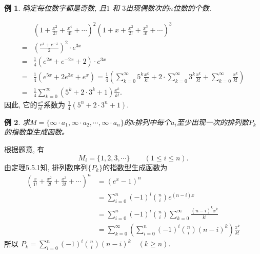 \documentclass[punct]{ctexbeamer}
\newtheorem{ex}{例}[section]
\def\sol{\noindent {\bf 解\ }}
\begin{document}
\begin{frame}
    \begin{ex}
        确定每位数字都是奇数, 且$1$ 和 $3$出现偶数次的$n$位数的个数.
    \end{ex}
    \pause\sol
    $$\begin{aligned}
        &\left(1+\frac{x^{2}}{2 !}+\frac{x^{4}}{4 !}+\cdots\right)^{2}\left(1+x+\frac{x^{2}}{2 !}+\frac{x^{3}}{3 !}+\cdots\right)^{3} \\ =&\left(\frac{e^{x}+e^{-x}}{2}\right)^{2} \cdot e^{3 x} \\
        =& \frac{1}{4}\left(e^{2 x}+e^{-2 x}+2\right) \cdot e^{3 x}\\
        =&\frac{1}{4}\left(e^{5 x}+2 e^{3 x}+e^{x}\right)=\frac{1}{4}\left(\sum_{k=0}^{\infty} 5^{k} \frac{ x^{k}}{k !}+2 \cdot \sum_{k=0}^{\infty} 3^{k} \frac{ x^{k}}{k !}+\sum_{k=0}^{\infty} \frac{x^{k}}{k !}\right)\\
        =&\frac{1}{4} \sum_{k=0}^{\infty}\left(5^{k}+2 \cdot 3^{k}+1\right) \frac{x^{k}}{k !}.
    \end{aligned}$$
    因此, 它的$\frac{x^{n}}{n!}$系数为
    $\frac{1}{4}\left(5^{n}+2 \cdot 3^{n}+1\right).$
\end{frame}



\begin{frame}
	\begin{ex}
		求$M=\{\infty\cdot a_{1},\infty\cdot a_{2},\cdots,\infty\cdot a_{n} \}$的$k$排列中每个$a_{i}$至少出现一次的排列数$P_{k}$的指数型生成函数。
	\end{ex}
\pause\sol
根据题意, 有$$M_{i}=\{1,2,3,\cdots\} \quad\quad (1\leq i\leq n).$$
由定理5.5.1知, 排列数序列$\{P_{k}\}$的指数型生成函数为
$$\begin{aligned}
\left(\frac{x}{1 !}+\frac{x^{2}}{2 !}+\frac{x^{3}}{3 !}+\cdots\right)^{n} &=\left(e^x-1\right)^{n} \\
&=\sum_{i=0}^{n}(-1)^{i}\binom{n}{i} e^{(n-i)x}  \\
&=\sum_{i=0}^{n}(-1)^{i}\binom{n}{i}\sum_{k=0}^{\infty} \frac{(n-i)^{k} x^{k}}{k !} \\
&=\sum_{k=0}^{\infty}\left( \sum_{i=0}^{n}(-1)^{i}\binom{n}{i}(n-i)^{k}\right) \frac{x^{k}}{k !}
\end{aligned}$$
所以
$	P_{k}=\sum_{i=0}^{n}(-1)^{i}\binom{n}{i}(n-i)^{k} \quad(k \geq n).$
\end{frame}
\end{document}
